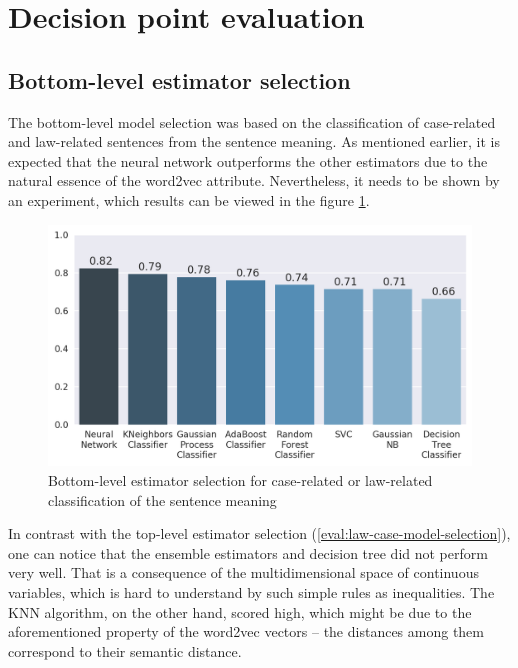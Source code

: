 \documentclass[
  digital, %
  notable,   %
  nolof,     %
  nolot,     %
]{fithesis3}
\begin{document}
\section{Decision point evaluation}

\subsection{Bottom-level estimator selection}
\label{eval:bottom-model-selection}
The bottom-level model selection was based on the classification of case-related and law-related sentences from the sentence meaning.
As mentioned earlier, it is expected that the neural network outperforms the other estimators due to the natural essence of the word2vec attribute.
Nevertheless, it needs to be shown by an experiment, which results can be viewed in the figure \ref{fig:bottom_level_model_selection}.
\begin{figure}[h]
\caption{Bottom-level estimator selection for case-related or law-related classification of the sentence meaning}
\label{fig:bottom_level_model_selection}
\includegraphics[width=\textwidth]{img/bottom_level_model_selection}
\end{figure}

In contrast with the top-level estimator selection (\ref{eval:law-case-model-selection}), one can notice that the ensemble estimators and decision tree did not perform very well.
That is a consequence of the multidimensional space of continuous variables, which is hard to understand by such simple rules as inequalities.
The KNN algorithm, on the other hand, scored high, which might be due to the aforementioned property of the word2vec vectors -- the distances among them correspond to their semantic distance.
\end{document}
